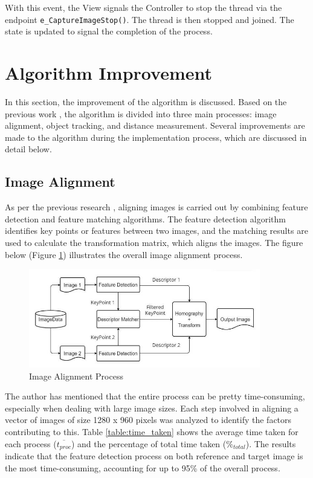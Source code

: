 With this event, the View signals the Controller to stop the thread via the endpoint \texttt{e\_CaptureImageStop()}. The thread is then stopped and joined. The state is updated to signal the completion of the process.

\section{Algorithm Improvement}
\label{sec:algorithm_improvement}

In this section, the improvement of the algorithm is discussed. Based on the previous work \cite{Sabtu_2023}, the algorithm is divided into three main processes: image alignment, object tracking, and distance measurement. Several improvements are made to the algorithm during the implementation process, which are discussed in detail below.

\subsection{Image Alignment}
As per the previous research \cite{Sabtu_2023}, aligning images is carried out by combining feature detection and feature matching algorithms. The feature detection algorithm identifies key points or features between two images, and the matching results are used to calculate the transformation matrix, which aligns the images. The figure below (Figure \ref{fig:image_alignment_process}) illustrates the overall image alignment process.

\begin{figure}[!ht]
    \centering
    \includegraphics[width=0.9\textwidth]{texs/Part2/chapter4/image/ImageAllignmentAlgoDiagram.jpg}
    \caption{Image Alignment Process}
    \label{fig:image_alignment_process}
\end{figure}

The author has mentioned that the entire process can be pretty time-consuming, especially when dealing with large image sizes. Each step involved in aligning a vector of images of size 1280 x 960 pixels was analyzed to identify the factors contributing to this. Table \ref{table:time_taken} shows the average time taken for each process ($\overline{t_{proc}}$) and the percentage of total time taken ($\%_{total}$). The results indicate that the feature detection process on both reference and target image is the most time-consuming, accounting for up to 95\% of the overall process.


